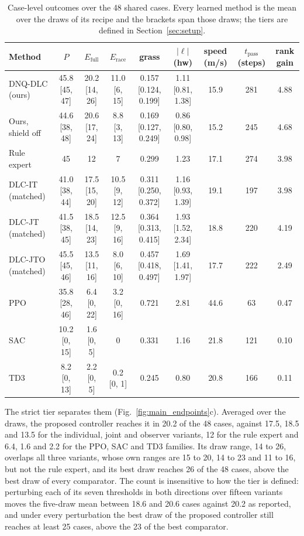 \documentclass[journal]{IEEEtran}
\begin{document}
\begin{table}[!t]
\centering
\caption{Case-level outcomes over the 48 shared cases. Every learned method is
the mean over the draws of its recipe and the brackets span those draws; the
tiers are defined in Section~\ref{sec:setup}.}
\label{tab:main_comparison}
\footnotesize
\setlength{\tabcolsep}{4pt}
\begin{tabular}{lcccccccc}
\toprule
Method & $P$ & $E_{\mathrm{full}}$ & $E_{\mathrm{race}}$ & grass &
$|\ell|$ (hw) & speed (m/s) & $t_{\mathrm{pass}}$ (steps) & rank gain \\
\midrule
DNQ-DLC (ours)          & 45.8 [45, 47] & 20.2 [14, 26] & 11.0 [6, 15] & 0.157 [0.124, 0.199] & 1.11 [0.81, 1.38] & 15.9 & 281 & 4.88 \\
Ours, shield off        & 44.6 [38, 48] & 20.6 [17, 24] & 8.8 [3, 13]  & 0.169 [0.127, 0.249] & 0.86 [0.80, 0.98] & 15.2 & 245 & 4.68 \\
Rule expert             & 45 & 12 & 7 & 0.299 & 1.23 & 17.1 & 274 & 3.98 \\
DLC-IT (matched)        & 41.0 [38, 44] & 17.5 [15, 20] & 10.5 [9, 12] & 0.311 [0.250, 0.372] & 1.16 [0.93, 1.39] & 19.1 & 197 & 3.98 \\
DLC-JT (matched)        & 41.5 [38, 45] & 18.5 [14, 23] & 12.5 [9, 16] & 0.364 [0.313, 0.415] & 1.93 [1.52, 2.34] & 18.8 & 220 & 4.19 \\
DLC-JTO (matched)       & 45.5 [45, 46] & 13.5 [11, 16] & 8.0 [6, 10]  & 0.457 [0.418, 0.497] & 1.69 [1.41, 1.97] & 17.7 & 222 & 2.49 \\
PPO                     & 35.8 [28, 46] & 6.4 [0, 22]  & 3.2 [0, 16] & 0.721 & 2.81 & 44.6 & 63   & 0.47 \\
SAC                     & 10.2 [0, 15]  & 1.6 [0, 5]   & 0 & 0.331 & 1.16 & 21.8 & 121  & 0.10 \\
TD3                     & 8.2 [0, 13]   & 2.2 [0, 5]   & 0.2 [0, 1]  & 0.245 & 0.80 & 20.8 & 166  & 0.11 \\
\bottomrule
\end{tabular}
\end{table}

The strict tier separates them (Fig.~\ref{fig:main_endpoints}c). Averaged over
the draws, the proposed controller reaches it in 20.2 of the 48 cases, against
17.5, 18.5 and 13.5 for the individual, joint and observer variants, 12 for the
rule expert and 6.4, 1.6 and 2.2 for the PPO, SAC and TD3 families. Its draw
range, 14 to 26, overlaps all three variants, whose own ranges are 15 to 20, 14
to 23 and 11 to 16, but not the rule expert, and its best draw reaches 26 of
the 48 cases, above the best draw of every comparator. The count is insensitive
to how the tier is defined:
perturbing each of its seven thresholds in both directions over fifteen variants
moves the five-draw mean between 18.6 and 20.6 cases against 20.2 as reported,
and under every perturbation the best draw of the proposed controller still
reaches at least 25 cases, above the 23 of the best comparator.
\end{document}
